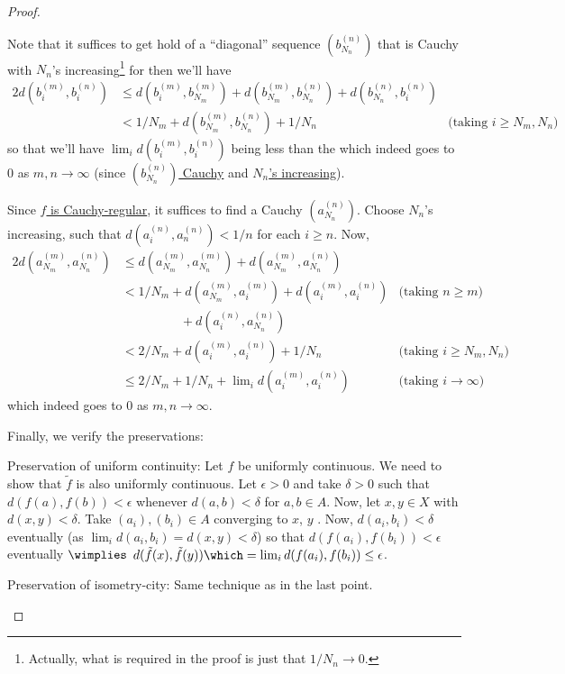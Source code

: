 \begin{proof}
\begin{prooflist}
			Note that it suffices to get hold of a ``diagonal'' sequence $(b^{(n)}_{N_n})$ that is Cauchy with $N_n$'s increasing\footnote{
				Actually, what is required in the proof is just that $1/N_n\to 0$.
			} for then we'll have
			\begin{alignat*}{2}
				d(b^{(m)}_i, b^{(n)}_i)
				& \le d(b^{(m)}_i, b^{(m)}_{N_m}) + d(b^{(m)}_{N_m}, b^{(n)}_{N_n}) + d(b^{(n)}_{N_n}, b^{(n)}_i)\\
				& < 1/N_m + d(b^{(m)}_{N_m}, b^{(n)}_{N_n}) + 1/N_n & \text{(taking $i\ge N_m, N_n$)}
			\end{alignat*}
			so that we'll have $\lim_i d(b^{(m)}_i, b^{(n)}_i)$ being less than the \RHS which indeed goes to $0$ as $m, n\to \infty$ (since \uline{$(b^{(n)}_{N_n})$ Cauchy} and \uline{$N_n$'s increasing}).
			
			Since \uline{$f$ is Cauchy-regular}, it suffices to find a Cauchy $(a^{(n)}_{N_n})$. Choose $N_n$'s increasing, such that $d(a^{(n)}_i, a^{(n)}_n) < 1/n$ for each $i\ge n$. Now,
			\begin{alignat*}{2}
				d(a^{(m)}_{N_m}, a^{(n)}_{N_n})
				& \le d(a^{(m)}_{N_m}, a^{(m)}_{N_n}) + d(a^{(m)}_{N_m}, a^{(n)}_{N_n})\\
				& < 1/N_m + d(a^{(m)}_{N_m}, a^{(m)}_i) + d(a^{(m)}_i, a^{(n)}_i) & \text{(taking $n\ge m$)}\\
				& \phantom{{} < 1/N_m}\hspace{10pt} {} + d(a^{(n)}_i, a^{(n)}_{N_n})\\
				& < 2/N_m + d(a^{(m)}_i, a^{(n)}_i) + 1/N_n & \text{(taking $i\ge N_m, N_n$)}\\
				& \le 2/N_m + 1/N_n + \lim\nolimits_i d(a^{(m)}_i, a^{(n)}_i) & \text{(taking $i\to \infty$)}
			\end{alignat*}
			which indeed goes to $0$ as $m, n\to\infty$.
		\end{prooflist}
			
		Finally, we verify the preservations:
			\begin{prooflist}
				\item Preservation of uniform continuity:
				Let $f$ be uniformly continuous. We need to show that $\tilde f$ is also uniformly continuous. Let $\epsilon > 0$ and take $\delta > 0$ such that $d(f(a), f(b)) < \epsilon$ whenever $d(a, b) < \delta$ for $a, b\in A$. Now, let $x, y\in X$ with $d(x, y) < \delta$. Take $(a_i), (b_i)\in A$ converging to $x$, $y$ \resp. Now, $d(a_i, b_i) < \delta$ eventually (as $\lim_i d(a_i, b_i) = d(x, y) < \delta$) so that $d(f(a_i), f(b_i)) < \epsilon$ eventually $\wimplies$ $d(\tilde f(x), \tilde f(y)) \which= \lim_i d(f(a_i), f(b_i))\le \epsilon$.
				
				
				\item Preservation of isometry-city:
				Same technique as in the last point.
				\qedhere
			\end{prooflist}
	\end{proof}
	
